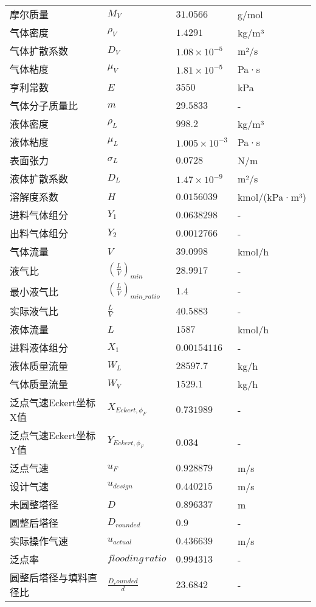 \begin{longtable}{
		@{} p{} p{} 
		p{} p{} @{}
		}
	摩尔质量 & $M_V$ & $31.0566$ & g/mol \\
	气体密度 & $\rho_V$ & $1.4291$ & kg/m³ \\
	气体扩散系数 & $D_V$ & $1.08 \times 10^{-5}$ & m²/s \\
	气体粘度 & $\mu_V$ & $1.81 \times 10^{-5}$ & Pa·s \\
	亨利常数 & $E$ & $3550$ & kPa \\
	气体分子质量比 & $m$ & $29.5833$ & - \\
	液体密度 & $\rho_L$ & $998.2$ & kg/m³ \\
	液体粘度 & $\mu_L$ & $1.005 \times 10^{-3}$ & Pa·s \\
	表面张力 & $\sigma_L$ & $0.0728$ & N/m \\
	液体扩散系数 & $D_L$ & $1.47 \times 10^{-9}$ & m²/s \\
	溶解度系数 & $H$ & $0.0156039$ & kmol/(kPa·m³) \\
	进料气体组分 & $Y_1$ & $0.0638298$ & - \\
	出料气体组分 & $Y_2$ & $0.0012766$ & - \\
	气体流量 & $V$ & $39.0998$ & kmol/h \\
	液气比 & $\left(\frac{L}{V}\right)_{min}$ & $28.9917$ & - \\
	最小液气比 & $\left(\frac{L}{V}\right)_{min\_ratio}$ & $1.4$ & - \\
	实际液气比 & $\frac{L}{V}$ & $40.5883$ & - \\
	液体流量 & $L$ & $1587$ & kmol/h \\
	进料液体组分 & $X_1$ & $0.00154116$ & - \\
	液体质量流量 & $W_L$ & $28597.7$ & kg/h \\
	气体质量流量 & $W_V$ & $1529.1$ & kg/h \\
	泛点气速Eckert坐标X值 & $X_{Eckert, \phi_F}$ & $0.731989$ & - \\
	泛点气速Eckert坐标Y值 & $Y_{Eckert, \phi_F}$ & $0.034$ & - \\
	泛点气速 & $u_F$ & $0.9 28879$ & m/s \\
	设计气速 & $u_{design}$ & $0.440215$ & m/s \\
	未圆整塔径 & $D$ & $0.896337$ & m \\
	圆整后塔径 & $D_{rounded}$ & $0.9$ & - \\
	实际操作气速 & $u_{actual}$ & $0.436639$ & m/s \\
	泛点率 & $flooding \, ratio$ & $0.9 94313$ & - \\
	圆整后塔径与填料直径比 & $\frac{D_rounded}{d}$ & $23.6842$ & - \\

\end{longtable}
